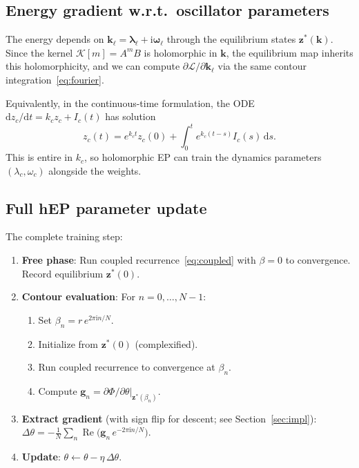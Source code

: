 \documentclass[11pt]{article}
\newcommand{\im}{\mathrm{i}}
\newcommand{\dd}{\mathrm{d}}
\theoremstyle{definition}
\DeclareMathOperator{\Real}{Re}
\begin{document}
\subsection{Energy gradient w.r.t.\ oscillator parameters}

The energy depends on $\bm{k}_\ell=\bm{\lambda}_\ell+\im\bm{\omega}_\ell$
through the equilibrium states $\bm{z}^*(\bm{k})$.  Since the kernel
$\mathcal{K}[m]=A^m B$ is holomorphic in $\bm{k}$, the equilibrium
map inherits this holomorphicity, and we can compute
$\partial\mathcal{L}/\partial\bm{k}_\ell$ via the same contour
integration~\eqref{eq:fourier}.

Equivalently, in the continuous-time formulation, the ODE
$\dd z_c/\dd t = k_c z_c + I_c(t)$ has solution
\[
  z_c(t) = e^{k_c t}z_c(0) + \int_0^t e^{k_c(t-s)}I_c(s)\,\dd s.
\]
This is entire in $k_c$, so holomorphic EP can train the dynamics
parameters $(\lambda_c,\omega_c)$ alongside the weights.

\subsection{Full hEP parameter update}

The complete training step:
\begin{enumerate}
\item \textbf{Free phase}: Run coupled recurrence~\eqref{eq:coupled}
  with $\beta=0$ to convergence.  Record equilibrium
  $\bm{z}^*(0)$.
\item \textbf{Contour evaluation}: For $n=0,\dots,N-1$:
  \begin{enumerate}[label=(\alph*)]
    \item Set $\beta_n = r\,e^{2\pi\im n/N}$.
    \item Initialize from $\bm{z}^*(0)$ (complexified).
    \item Run coupled recurrence to convergence at $\beta_n$.
    \item Compute
      $\bm{g}_n = \partial\Phi/\partial\theta|_{\bm{z}^*(\beta_n)}$.
  \end{enumerate}
\item \textbf{Extract gradient} (with sign flip for descent; see
  Section~\ref{sec:impl}):
  $\Delta\theta = -\frac{1}{N}\sum_n \Real\!\bigl(\bm{g}_n\,
  e^{-2\pi\im n/N}\bigr)$.
\item \textbf{Update}: $\theta \leftarrow \theta - \eta\,\Delta\theta$.
\end{enumerate}

\end{document}
